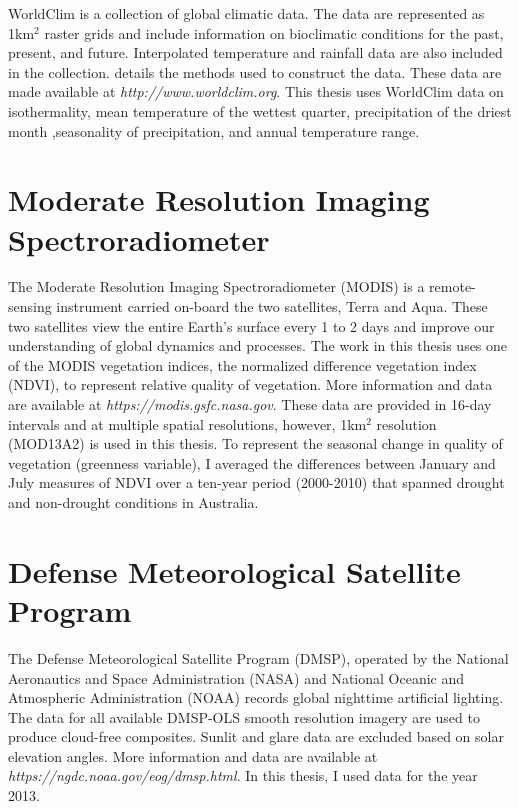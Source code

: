 WorldClim is a collection of global climatic data. The data are represented as 1km$^2$ raster grids and include information on bioclimatic conditions for the past, present, and future. Interpolated temperature and rainfall data are also included in the collection. \cite{hijm05} details the methods used to construct the data. These data are made available at \textit{http://www.worldclim.org}. This thesis uses WorldClim data on isothermality, mean temperature of the wettest quarter, precipitation of the driest month ,seasonality of precipitation, and annual temperature range.

\section{Moderate Resolution Imaging Spectroradiometer}

The Moderate Resolution Imaging Spectroradiometer (MODIS) is a remote-sensing instrument carried on-board the two satellites, Terra and Aqua. These two satellites view the entire Earth's surface every 1 to 2 days and improve our understanding of global dynamics and processes. The work in this thesis uses one of the MODIS vegetation indices, the normalized difference vegetation index (NDVI), to represent relative quality of vegetation. More information and data are available at \textit{https://modis.gsfc.nasa.gov}. These data are provided in 16-day intervals and at multiple spatial resolutions, however, 1km$^2$ resolution (MOD13A2) is used in this thesis. To represent the seasonal change in quality of vegetation (greenness variable), I averaged the differences between January and July measures of NDVI over a ten-year period (2000-2010) that spanned drought and non-drought conditions in Australia.

\section{Defense Meteorological Satellite Program}

The Defense Meteorological Satellite Program (DMSP), operated by the National Aeronautics and Space Administration (NASA) and National Oceanic and Atmospheric Administration (NOAA) records global nighttime artificial lighting. The data for all available DMSP-OLS smooth resolution imagery are used to produce cloud-free composites. Sunlit and glare data are excluded based on solar elevation angles. More information and data are available at \textit{https://ngdc.noaa.gov/eog/dmsp.html}. In this thesis, I used data for the year 2013.

